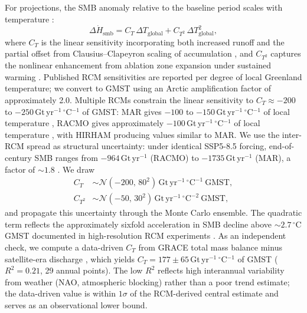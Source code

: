 \documentclass[11pt]{article}
\begin{document}
For projections, the SMB anomaly relative to the baseline period scales with temperature \citep[][Eq.~4.8]{CuffeyPaterson2010}:
\begin{equation}
	\Delta \dot{H}_{\mathrm{smb}} = C_T\, \Delta T_{\mathrm{global}} + C_{T^2}\, \Delta T_{\mathrm{global}}^2,
	\label{eq:smb_sensitivity}
\end{equation}
where $C_T$ is the linear sensitivity incorporating both increased runoff and the partial offset from Clausius--Clapeyron scaling of accumulation \citep{Gregory2006}, and $C_{T^2}$ captures the nonlinear enhancement from ablation zone expansion under sustained warming \citep{Noel2021, Sellevold2020}. Published RCM sensitivities are reported per degree of local Greenland temperature; we convert to GMST using an Arctic amplification factor of approximately 2.0. Multiple RCMs constrain the linear sensitivity to $C_T \approx -200$ to $-250$\,Gt\,yr$^{-1}$\,$^\circ$C$^{-1}$ of GMST: MAR gives $-100$ to $-150$\,Gt\,yr$^{-1}$\,$^\circ$C$^{-1}$ of local temperature \citep{Fettweis2013, Hanna2021}, RACMO gives approximately $-100$\,Gt\,yr$^{-1}$\,$^\circ$C$^{-1}$ of local temperature \citep{Noel2018}, with HIRHAM producing values similar to MAR. We use the inter-RCM spread as structural uncertainty: under identical SSP5-8.5 forcing, end-of-century SMB ranges from $-964$\,Gt\,yr$^{-1}$ (RACMO) to $-1735$\,Gt\,yr$^{-1}$ (MAR), a factor of $\sim\!1.8$ \citep{Glaude2024}. We draw
\begin{align}
	C_T &\sim \mathcal{N}\!\left(-200,\, 80^2\right)\,\mathrm{Gt\,yr^{-1}\,{^\circ C}^{-1}\ GMST}, \label{eq:smb_CT} \\
	C_{T^2} &\sim \mathcal{N}\!\left(-50,\, 30^2\right)\,\mathrm{Gt\,yr^{-1}\,{^\circ C}^{-2}\ GMST}, \label{eq:smb_CT2}
\end{align}
and propagate this uncertainty through the Monte Carlo ensemble. The quadratic term reflects the approximately sixfold acceleration in SMB decline above $\sim\!2.7\,^\circ$C GMST documented in high-resolution RCM experiments \citep{Sellevold2020, Noel2021}. As an independent check, we compute a data-driven $C_T$ from GRACE total mass balance minus satellite-era discharge \citep{Otosaka2023, Mankoff2021}, which yields $C_T = 177 \pm 65$\,Gt\,yr$^{-1}$\,$^\circ$C$^{-1}$ of GMST ($R^2 = 0.21$, 29 annual points). The low $R^2$ reflects high interannual variability from weather (NAO, atmospheric blocking) rather than a poor trend estimate; the data-driven value is within $1\sigma$ of the RCM-derived central estimate and serves as an observational lower bound.
\end{document}
